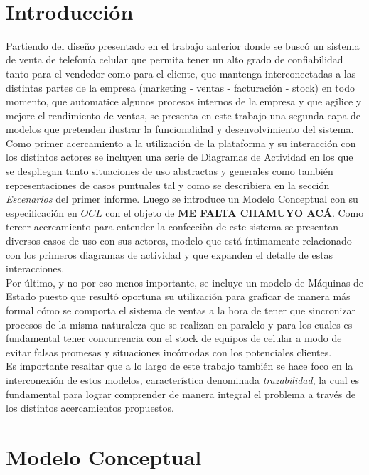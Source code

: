 ‌\section{Introducción}
Partiendo del diseño presentado en el trabajo anterior donde se buscó un sistema de venta de telefonía celular que permita tener un alto grado de confiabilidad tanto para el vendedor como para el cliente, que mantenga interconectadas a las distintas partes de la empresa (marketing - ventas - facturación - stock) en todo momento, que automatice algunos procesos internos de la empresa y que agilice y mejore el rendimiento de ventas, se presenta en este trabajo una segunda capa de modelos que pretenden ilustrar la funcionalidad y desenvolvimiento del sistema.\\
\indent Como primer acercamiento a la utilización de la plataforma y su interacción con los distintos actores se incluyen una serie de Diagramas de Actividad en los que se despliegan tanto situaciones de uso abstractas y generales como también representaciones de casos puntuales tal y como se describiera en la sección \textsl{Escenarios} del primer informe. Luego se introduce un Modelo Conceptual con su especificación en $OCL$ con el objeto de \textbf{ME FALTA CHAMUYO ACÁ}. Como tercer acercamiento para entender la confecciòn de este sistema se presentan diversos casos de uso con sus actores, modelo que está íntimamente relacionado con los primeros diagramas de actividad y que expanden el detalle de estas interacciones.\\
\indent Por último, y no por eso menos importante, se incluye un modelo de Máquinas de Estado puesto que resultó oportuna su utilización para graficar de manera más formal cómo se comporta el sistema de ventas a la hora de tener que sincronizar procesos de la misma naturaleza que se realizan en paralelo y para los cuales es fundamental tener concurrencia con el stock de equipos de celular a modo de evitar falsas promesas y situaciones incómodas con los potenciales clientes.\\
\indent Es importante resaltar que a lo largo de este trabajo también se hace foco en la interconexión de estos modelos, característica denominada \textsl{trazabilidad}, la cual es fundamental para lograr comprender de manera integral el problema a través de los distintos acercamientos propuestos.\\

\section{Modelo Conceptual}


